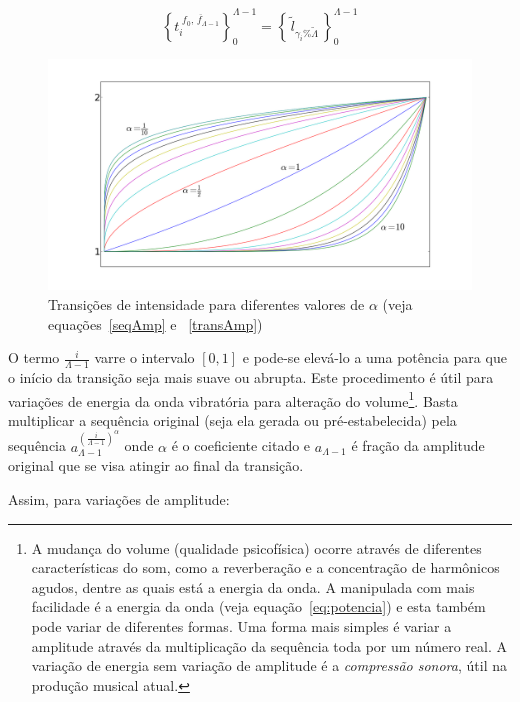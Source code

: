 \begin{equation}\label{serieAmostralLog}
\left\{t_i^{\;\overline{f_0,\,f_{\Lambda-1}}}\right\}_0^{\Lambda-1}=\left\{\,\widetilde{l}_{\gamma_i \% \widetilde{\Lambda}}\,\right\}_0^{\Lambda-1}
\end{equation}

\begin{figure}[h!]
    \centering
        \includegraphics[width=\textwidth]{figuras/transicao}
    \caption{Transições de intensidade para diferentes valores de $\alpha$ (veja equações~\ref{seqAmp} e ~\ref{transAmp})}
        \label{fig:transicao}
\end{figure}


O termo $\frac{i}{\Lambda-1}$ varre o intervalo $[0,1]$ e pode-se elevá-lo a uma potência
para que o início da transição seja mais suave ou abrupta.
Este procedimento é útil para variações de energia
da onda vibratória para alteração do volume\footnote{A mudança do volume (qualidade psicofísica) ocorre através de diferentes características 
do som, como a reverberação e a concentração de harmônicos agudos, dentre as quais está a energia da onda.
A manipulada com mais facilidade é a energia da onda (veja equação~\ref{eq:potencia}) e esta também pode variar de diferentes formas.
Uma forma mais simples é variar a amplitude através da multiplicação da sequência toda
por um número real. A variação de energia sem variação de
amplitude é a \emph{compressão sonora}, útil na
produção musical atual.\cite{compressao}}. Basta multiplicar a sequência original
(seja ela gerada ou pré-estabelecida) pela sequência $a_{\Lambda-1}^{\left( \frac{i}{\Lambda-1} \right )^\alpha}$
onde $\alpha$ é o coeficiente citado e $a_{\Lambda-1}$ é fração da amplitude original que se visa atingir ao final da transição.

Assim, para variações de amplitude:

